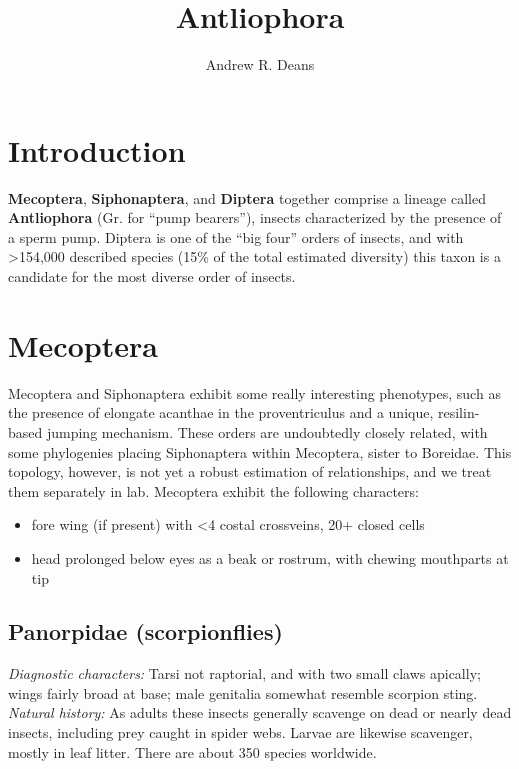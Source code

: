 \documentclass[letterpaper, 11pt]{article}
\title{Antliophora}
\author{Andrew R. Deans}
\begin{document}
\cleanlookdateon %
\maketitle
\thispagestyle{fancy}
\section*{Introduction}
\textbf{Mecoptera}, \textbf{Siphonaptera}, and \textbf{Diptera} together comprise a lineage called \textbf{Antliophora} (Gr. for ``pump bearers''), insects characterized by the presence of a sperm pump. Diptera is one of the ``big four'' orders of insects, and with \textgreater154,000 described species (15\% of the total estimated diversity) this taxon is a candidate for the most diverse order of insects.

\section{Mecoptera}
Mecoptera and Siphonaptera exhibit some really interesting phenotypes, such as the presence of elongate acanthae in the proventriculus and a unique, resilin-based jumping mechanism. These orders are undoubtedly closely related, with some phylogenies placing Siphonaptera within Mecoptera, sister to Boreidae. This topology, however, is not yet a robust estimation of relationships, and we treat them separately in lab. Mecoptera exhibit the following characters:
\begin{itemize}
\item fore wing (if present) with \textless4 costal crossveins, 20+ closed cells
\item head prolonged below eyes as a beak or rostrum, with chewing mouthparts at tip
\end{itemize}


\subsection{Panorpidae (scorpionflies)}
\noindent{}\textit{Diagnostic characters:} Tarsi not raptorial, and with two small claws apically; wings fairly broad at base; male genitalia somewhat resemble scorpion sting.\\

\noindent{}\textit{Natural history:} As adults these insects generally scavenge on dead or nearly dead insects, including prey caught in spider webs. Larvae are likewise scavenger, mostly in leaf litter. There are about 350 species worldwide.
\end{document}
